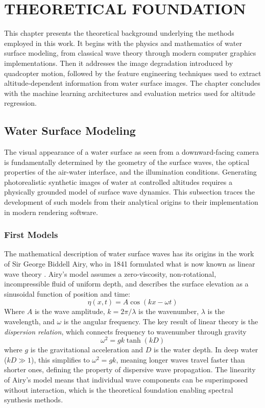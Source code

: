 \section{THEORETICAL FOUNDATION}

This chapter presents the theoretical background underlying the methods employed in this work. It begins with the physics and mathematics of water surface modeling, from classical wave theory through modern computer graphics implementations. Then it addresses the image degradation introduced by quadcopter motion, followed by the feature engineering techniques used to extract altitude-dependent information from water surface images. The chapter concludes with the machine learning architectures and evaluation metrics used for altitude regression.

\subsection{Water Surface Modeling}

The visual appearance of a water surface as seen from a downward-facing camera is fundamentally determined by the geometry of the surface waves, the optical properties of the air-water interface, and the illumination conditions. Generating photorealistic synthetic images of water at controlled altitudes requires a physically grounded model of surface wave dynamics. This subsection traces the development of such models from their analytical origins to their implementation in modern rendering software.

    \subsubsection{First Models}

    The mathematical description of water surface waves has its origins in the work of Sir George Biddell Airy, who in 1841 formulated what is now known as linear wave theory \cite{Airy1841}. Airy's model assumes a zero-viscosity, non-rotational, incompressible fluid of uniform depth, and describes the surface elevation as a sinusoidal function of position and time:
    \begin{equation}
        \eta(x, t) = A \cos(kx - \omega t)
        \label{eq:airy}
    \end{equation}
    Where $A$ is the wave amplitude, $k = 2\pi/\lambda$ is the wavenumber, $\lambda$ is the wavelength, and $\omega$ is the angular frequency. The key result of linear theory is the \emph{dispersion relation}, which connects frequency to wavenumber through gravity
    \begin{equation}
        \omega^2 = gk \tanh(kD)
        \label{eq:dispersion}
    \end{equation}
    where $g$ is the gravitational acceleration and $D$ is the water depth. In deep water ($kD \gg 1$), this simplifies to $\omega^2 = gk$, meaning longer waves travel faster than shorter ones, defining the property of dispersive wave propagation. The linearity of Airy's model means that individual wave components can be superimposed without interaction, which is the theoretical foundation enabling spectral synthesis methods.

